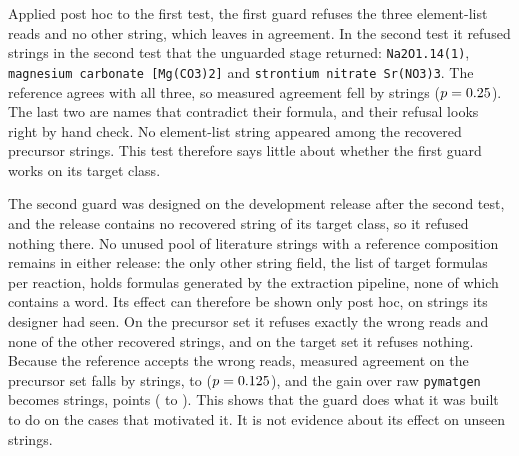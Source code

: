 \documentclass[10pt,journal]{IEEEtran}
\newcommand{\pmg}{\texttt{pymatgen}\xspace}
\begin{document}
Applied post hoc to the first test, the first guard refuses the three element-list reads and no other string, which leaves \GuardOneAgree{} in agreement. In the second test it refused \StTwoGuardRefused{} strings in the second test that the unguarded stage returned: \texttt{Na2O1.14(1)}, \texttt{magnesium carbonate [Mg(CO3)2]} and \texttt{strontium nitrate Sr(NO3)3}. The reference agrees with all three, so measured agreement fell by \StTwoGuardCostB{} strings ($p=0.25$). The last two are names that contradict their formula, and their refusal looks right by hand check. No element-list string appeared among the recovered precursor strings. This test therefore says little about whether the first guard works on its target class.

The second guard was designed on the development release after the second test, and the release contains no recovered string of its target class, so it refused nothing there. No unused pool of literature strings with a reference composition remains in either release: the only other string field, the list of target formulas per reaction, holds formulas generated by the extraction pipeline, none of which contains a word. Its effect can therefore be shown only post hoc, on strings its designer had seen. On the precursor set it refuses exactly the \GthreeTwoRefused{} wrong reads and none of the other recovered strings, and on the target set it refuses nothing. Because the reference accepts the wrong reads, measured agreement on the precursor set falls by \GthreeTwoCost{} strings, to \GthreeTwoAgree{} ($p=0.125$), and the gain over raw \pmg becomes \GthreeTwoGainPmg{} strings, \GthreeTwoDiffPmg{} points (\GthreeTwoLoPmg{} to \GthreeTwoHiPmg). This shows that the guard does what it was built to do on the cases that motivated it. It is not evidence about its effect on unseen strings.
\end{document}
